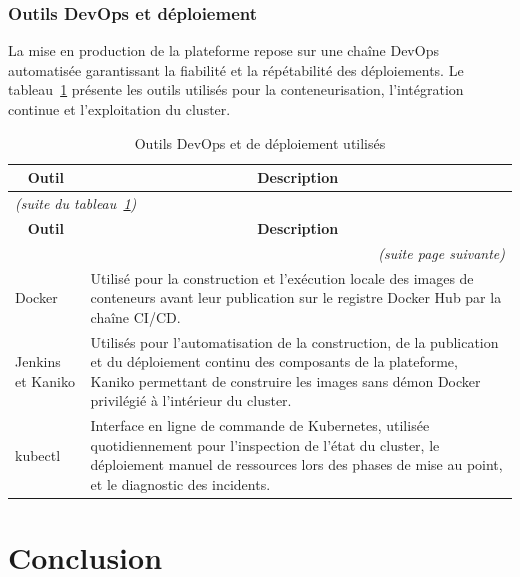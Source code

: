 \vspace{1em}

\subsubsection{Outils DevOps et déploiement}

La mise en production de la plateforme repose sur une chaîne DevOps automatisée garantissant la fiabilité et la répétabilité des déploiements. Le tableau~\ref{tab:outils-devops} présente les outils utilisés pour la conteneurisation, l'intégration continue et l'exploitation du cluster.

\renewcommand{\arraystretch}{1.3}

\begingroup
\centering
\renewcommand{\arraystretch}{1.2}
\begin{longtable}{|m{3cm}|m{11.5cm}|}
\caption{Outils DevOps et de déploiement utilisés}
\label{tab:outils-devops}\\
\hline
\multicolumn{1}{|c|}{\textbf{Outil}} & \multicolumn{1}{c|}{\textbf{Description}} \\
\hline
\endfirsthead

\multicolumn{2}{l}{\small\itshape (suite du tableau~\ref{tab:outils-devops})}\\
\hline
\multicolumn{1}{|c|}{\textbf{Outil}} & \multicolumn{1}{c|}{\textbf{Description}} \\
\hline
\endhead

\hline
\multicolumn{2}{r}{\small\itshape (suite page suivante)}\\
\endfoot

\hline
\endlastfoot

Docker & Utilisé pour la construction et l'exécution locale des images de conteneurs avant leur publication sur le registre Docker Hub par la chaîne CI/CD. \\
\hline
Jenkins et Kaniko & Utilisés pour l'automatisation de la construction, de la publication et du déploiement continu des composants de la plateforme, Kaniko permettant de construire les images sans démon Docker privilégié à l'intérieur du cluster. \\
\hline
kubectl & Interface en ligne de commande de Kubernetes, utilisée quotidiennement pour l'inspection de l'état du cluster, le déploiement manuel de ressources lors des phases de mise au point, et le diagnostic des incidents. \\
\hline
\end{longtable}
\endgroup
\section{Conclusion}

